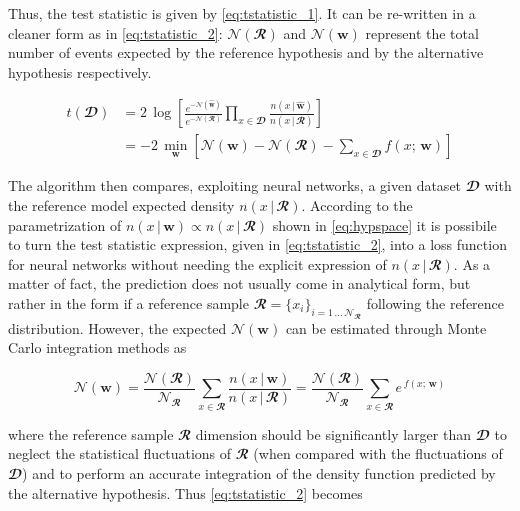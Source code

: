 Thus, the test statistic is given by \autoref{eq:tstatistic_1}. It can be re-written in a cleaner form as in
\autoref{eq:tstatistic_2}: $\mathcal{N}(\mathbfcal{R})$ and $\mathcal{N}(\mathbf{w})$ represent the total number of
events expected by the reference hypothesis and by the alternative hypothesis respectively.

\begin{align}
    t(\mathbfcal{D}) & = 2 \, \log \left[
        \frac{
            e^{-\mathcal{N}(\widehat{\mathbf{w}})}
        }{
            e^{-\mathcal{N}(\mathbfcal{R})}
        }
        \prod_{x \in \mathbfcal{D}}
        \frac{
            n(x\,|\,\widehat{\mathbf{w}})  
        }{
            n(x\,|\,\mathbfcal{R})
        }
    \right] \label{eq:tstatistic_1}\\
    & = -2\,\min_{\mathbf{w}} \left[
        \mathcal{N}(\mathbf{w})-\mathcal{N}(\mathbfcal{R}) - \sum_{x \in \mathbfcal{D}}  f(x;\,\mathbf{w})
    \right] \label{eq:tstatistic_2}
\end{align}

The algorithm then compares, exploiting neural networks, a given dataset $\mathbfcal{D}$ with the reference model
expected density $n(x\,|\,\mathbfcal{R})$. According to the parametrization of $n(x\,|\,\mathbf{w}) \propto
n(x\,|\,\mathbfcal{R})$ shown in \autoref{eq:hypspace} it is possibile to turn the test statistic expression, given in
\autoref{eq:tstatistic_2}, into a loss function for neural networks without needing the explicit expression of
$n(x\,|\,\mathbfcal{R})$. As a matter of fact, the prediction does not usually come in analytical form, but rather in
the form if a reference sample $\mathbfcal{R}=\{x_i\}_{i=1\,\ldots\,\mathcal{N}_{\mathbfcal{R}}}$ following the
reference distribution. However, the expected $\mathcal{N}(\mathbf{w})$ can be estimated through Monte Carlo integration
methods as

\begin{equation}
    \mathcal{N}(\mathbf{w}) = 
    \frac{
        \mathcal{N}(\mathbfcal{R})
        }{
            \mathcal{N}_{\mathbfcal{R}}
        }
    \sum_{x \in \mathbfcal{R}}
    \frac{
        n(x\,|\,\mathbf{w})
    }{
        n(x\,|\,\mathbfcal{R})
    } =
    \frac{
        \mathcal{N}(\mathbfcal{R})
    }{
        \mathcal{N}_{\mathbfcal{R}}
    }
    \sum_{x \in \mathbfcal{R}}
    e^{\,f(x;\,\mathbf{w})} 
\end{equation}

\noindent where the reference sample $\mathbfcal{R}$ dimension should be significantly larger than $\mathbfcal{D}$ to
neglect the statistical fluctuations of $\mathbfcal{R}$ (when compared with the fluctuations of $\mathbfcal{D}$) and to
perform an accurate integration of the density function predicted by the alternative hypothesis. Thus
\autoref{eq:tstatistic_2} becomes

